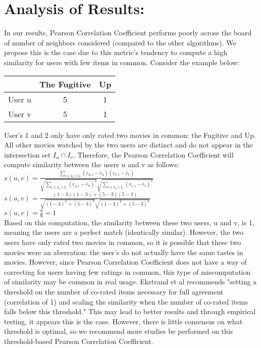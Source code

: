 \documentclass[11pt,letterpaper]{article}
\begin{document}
\section{Analysis of Results:}
In our results, Pearson Correlation Coefficient performs poorly across the board of number of neighbors considered (compared to the other algorithms). We propose this is the case due to this metric's tendency to compute a high similarity for users with few items in common. Consider the example below:
\begin{center}
 \begin{tabular}{||c c c||}
 \hline
  & The Fugitive & Up \\ [0.5ex]
 \hline\hline
 User u & 5 & 1  \\
 \hline
 User v & 5 & 1  \\
 \hline
\end{tabular}
\end{center}
User's 1 and 2 only have only rated two movies in common: the Fugitive and Up. All other movies watched by the two users are distinct and do not appear in the intersection set $I_{u} \cap I_{v}$.
Therefore, the Pearson Correlation Coefficient will compute similarity between the users u and v as follows:
$s(u,v) = \frac{\sum_{i \in I_{u} \cap I_{v}} (r_{u, i} - \bar r_{u}) (r_{v, i} - \bar r_{v})}{\sqrt{\sum_{i \in I_{u} \cap I_{v}}(r_{u, i} - \bar r_{u})^2} \sqrt{\sum_{i \in I_{u} \cap I_{v}}(r_{v, i} - \bar r_{v})^2}} $\\
$s(u,v) = \frac{(1-3)(1-3)+ (5-3)(5-3)}{\sqrt{(1-3)^2 + (5-3)^2} \sqrt{(1-3)^2 + (5-3)^2}}$ \\
$s(u,v) = \frac{8}{8} = 1$\\
Based on this computation, the similarity between these two users, u and v, is 1, meaning the users are a perfect match (identically similar). However, the two users have only rated two movies in common, so it is possible that these two movies were an aberration: the user's do not actually have the same tastes in movies. However, since Pearson Correlation Coefficient does not have a way of correcting for users having few ratings in common, this type of miscomputation of similarity may be common in real usage. Ekstrand et al recommends "setting a threshold on the number of co-rated items necessary for full agreement (correlation of 1) and scaling the similarity when the number of co-rated items falls below this threshold." This may lead to better results and through empirical testing, it appears this is the case. However, there is little consensus on what threshold is optimal, so we recommend more studies be performed on this threshold-based Pearson Correlation Coefficient. \\
\end{document}
